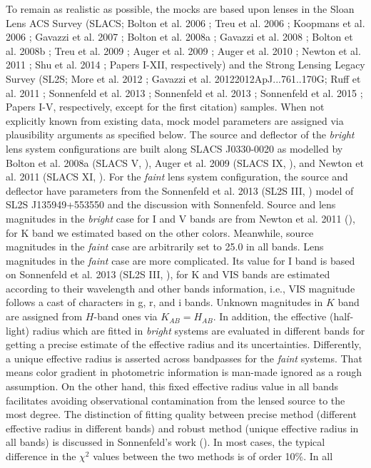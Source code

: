 \documentclass[a4paper,11pt]{article}
\begin{document}
To remain as realistic as possible, the mocks are based upon lenses in the Sloan Lens ACS Survey (SLACS; Bolton et al. 2006 \cite{2006ApJ...638..703B}; Treu et al. 2006 \cite{2006ApJ...640..662T}; Koopmans et al. 2006 \cite{2006ApJ...649..599K}; Gavazzi et al. 2007 \cite{2007ApJ...667..176G}; Bolton et al. 2008a \cite{2008ApJ...682..964B}; Gavazzi et al. 2008 \cite{2008ApJ...677.1046G}; Bolton et al. 2008b \cite{2008ApJ...684..248B}; Treu et al. 2009 \cite{2009ApJ...690..670T}; Auger et al. 2009 \cite{2009ApJ...705.1099A}; Auger et al. 2010 \cite{2010ApJ...724..511A}; Newton et al. 2011 \cite{2011ApJ...734..104N}; Shu et al. 2014 \cite{2014arXiv1407.2240S}; Papers I-XII, respectively) and the Strong Lensing Legacy Survey (SL2S; More et al. 2012 \cite{2012ApJ...749...38M}; Gavazzi et al. 2012{2012ApJ...761..170G}; Ruff et al. 2011 \cite{2011ApJ...727...96R}; Sonnenfeld et al. 2013 \cite{2013ApJ...777...97S}; Sonnenfeld et al. 2013 \cite{2013ApJ...777...98S}; Sonnenfeld et al. 2015 \cite{2015ApJ...800...94S}; Papers I-V, respectively, except for the first citation) samples. When not explicitly known from existing data, mock model parameters are assigned via plausibility arguments as specified below. The source and deflector of the \textit{bright} lens system configurations are built along SLACS J0330-0020 as modelled by Bolton et al. 2008a (SLACS V, \cite{2008ApJ...682..964B}), Auger et al. 2009 (SLACS IX, \cite{2009ApJ...705.1099A}), and Newton et al. 2011 (SLACS XI, \cite{2011ApJ...734..104N}). For the \textit{faint} lens system configuration, the source and deflector have parameters from the Sonnenfeld et al. 2013 (SL2S III, \cite{2013ApJ...777...97S}) model of SL2S J135949+553550 and the discussion with Sonnenfeld. Source and lens magnitudes in the \textit{bright} case for I and V bands are from Newton et al. 2011 (\cite{2011ApJ...734..104N}), for K band we estimated based on the other colors. Meanwhile, source magnitudes in the \textit{faint} case are arbitrarily set to 25.0 in all bands. Lens magnitudes in the \textit{faint} case are more complicated. Its value for I band is based on Sonnenfeld et al. 2013 (SL2S III, \cite{2013ApJ...777...97S}), for K and VIS bands are estimated according to their wavelength and other bands information, i.e., VIS magnitude follows a cast of characters in g, r, and i bands. Unknown magnitudes in $K$ band are assigned from $H$-band ones via $K_{AB}=H_{AB}.$ In addition, the effective (half-light) radius which are fitted in \textit{bright} systems are evaluated in different bands for getting a precise estimate of the effective radius and its uncertainties. Differently, a unique effective radius is asserted across bandpasses for the \textit{faint} systems. That means color gradient in photometric information is man-made ignored as a rough assumption. On the other hand, this fixed effective radius value in all bands facilitates avoiding observational contamination from the lensed source to the most degree. The distinction of fitting quality between precise method (different effective radius in different bands) and robust method (unique effective radius in all bands) is discussed in Sonnenfeld's work (\cite{2013ApJ...777...97S}). In most cases, the typical difference in the $\chi^{2}$ values between the two methods is of order 10\%. In all 
\end{document}
